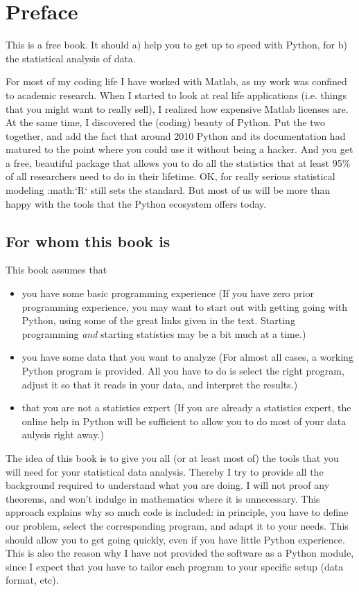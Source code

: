 \chapter*{Preface}

This is a free book. It should a) help you to get up to speed with
Python, for b) the statistical analysis of data.

For most of my coding life I have worked with Matlab, as my work was
confined to academic research. When I started to look at real life
applications (i.e. things that you might want to really sell), I
realized how expensive Matlab licenses are. At the same time, I
discovered the (coding) beauty of Python. Put the two together, and add
the fact that around 2010 Python and its documentation had matured to
the point where you could use it without being a hacker. And you get a
free, beautiful package that allows you to do all the statistics that at
least 95\% of all researchers need to do in their lifetime. OK, for
really serious statistical modeling :math:`R` still sets the standard.
But most of us will be more than happy with the tools that the Python
ecosystem offers today.

\section*{For whom this book is}

This book assumes that

\begin{itemize}
  \item you have some basic programming experience (If you have zero prior programming experience, you may want to start out with getting going with Python, using some of the great links given in the text. Starting programming \emph{and} starting statistics may be a bit much at a time.)
  \item you have some data that you want to analyze (For almost all cases, a working Python program is provided. All you have to do is select the right program, adjust it so that it reads in your data, and interpret the results.)
  \item that you are not a statistics expert (If you are already a statistics expert, the online help in Python will be sufficient to allow you to do most of your data anlysis right away.)
\end{itemize}


The idea of this book is to give you all (or at least most of) the tools
that you will need for your statistical data analysis. Thereby I try to
provide all the background required to understand what you are doing. I
will not proof any theorems, and won't indulge in mathematics where it
is unnecessary. This approach explains why so much code is included: in
principle, you have to define our problem, select the corresponding
program, and adapt it to your needs. This should allow you to get going
quickly, even if you have little Python experience. This is also the
reason why I have not provided the software as a Python module, since I
expect that you have to tailor each program to your specific setup (data
format, etc).

